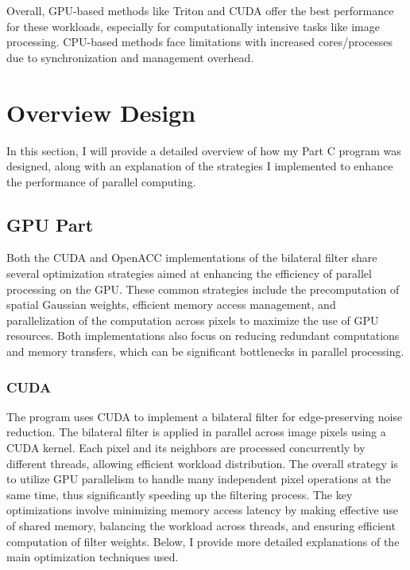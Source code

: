 \documentclass[12pt,a4paper]{report}
\begin{document}
Overall, GPU-based methods like Triton and CUDA offer the best performance for these workloads, especially for computationally intensive tasks like image processing. CPU-based methods face limitations with increased cores/processes due to synchronization and management overhead.

\section{Overview Design} \label{res}

In this section, I will provide a detailed overview of how my Part C program was designed, along with an explanation of the strategies I implemented to enhance the performance of parallel computing.

\subsection{GPU Part}

Both the CUDA and OpenACC implementations of the bilateral filter share several optimization strategies aimed at enhancing the efficiency of parallel processing on the GPU. These common strategies include the precomputation of spatial Gaussian weights, efficient memory access management, and parallelization of the computation across pixels to maximize the use of GPU resources. Both implementations also focus on reducing redundant computations and memory transfers, which can be significant bottlenecks in parallel processing.

\subsubsection*{CUDA}
The program uses CUDA to implement a bilateral filter for edge-preserving noise reduction. The bilateral filter is applied in parallel across image pixels using a CUDA kernel. Each pixel and its neighbors are processed concurrently by different threads, allowing efficient workload distribution. The overall strategy is to utilize GPU parallelism to handle many independent pixel operations at the same time, thus significantly speeding up the filtering process. The key optimizations involve minimizing memory access latency by making effective use of shared memory, balancing the workload across threads, and ensuring efficient computation of filter weights. Below, I provide more detailed explanations of the main optimization techniques used.
\end{document}
